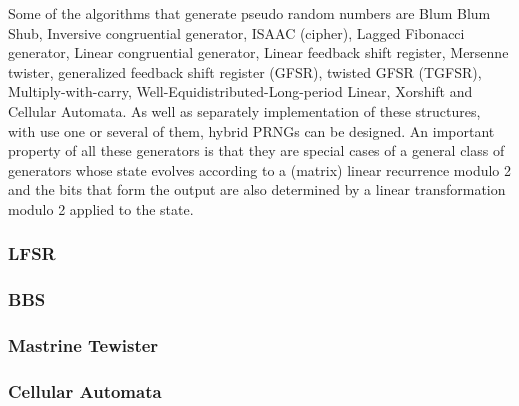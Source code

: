 Some of the algorithms that generate pseudo random numbers are Blum Blum Shub, Inversive congruential generator, ISAAC (cipher), Lagged Fibonacci generator, Linear congruential generator, Linear feedback shift register, Mersenne twister, generalized feedback shift register (GFSR), twisted GFSR (TGFSR), Multiply-with-carry, Well-Equidistributed-Long-period Linear, Xorshift and Cellular Automata. As well as separately implementation of these structures, with use one or several of them, hybrid PRNGs can be designed. An important property of all these generators is that they are special cases of a general class of generators whose state evolves according to a (matrix) linear recurrence modulo 2 and the bits that form the output are also determined by a linear transformation modulo 2 applied to the state.

\subsubsection{LFSR}

\subsubsection{BBS}

\subsubsection{Mastrine Tewister}

\subsubsection{Cellular Automata}
